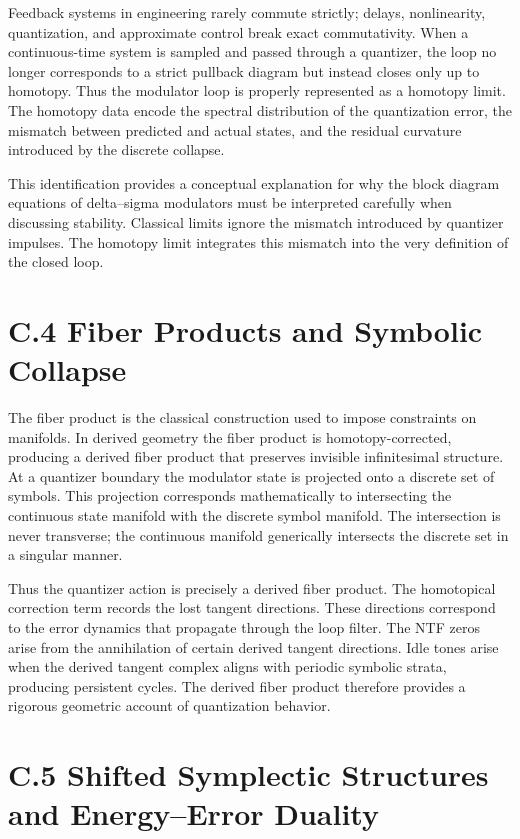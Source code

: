 Feedback systems in engineering rarely commute strictly; delays, nonlinearity, quantization, and approximate control break exact commutativity. When a continuous-time system is sampled and passed through a quantizer, the loop no longer corresponds to a strict pullback diagram but instead closes only up to homotopy. Thus the modulator loop is properly represented as a homotopy limit. The homotopy data encode the spectral distribution of the quantization error, the mismatch between predicted and actual states, and the residual curvature introduced by the discrete collapse.

This identification provides a conceptual explanation for why the block diagram equations of delta–sigma modulators must be interpreted carefully when discussing stability. Classical limits ignore the mismatch introduced by quantizer impulses. The homotopy limit integrates this mismatch into the very definition of the closed loop.

\section{C.4 Fiber Products and Symbolic Collapse}

The fiber product is the classical construction used to impose constraints on manifolds. In derived geometry the fiber product is homotopy-corrected, producing a derived fiber product that preserves invisible infinitesimal structure. At a quantizer boundary the modulator state is projected onto a discrete set of symbols. This projection corresponds mathematically to intersecting the continuous state manifold with the discrete symbol manifold. The intersection is never transverse; the continuous manifold generically intersects the discrete set in a singular manner.

Thus the quantizer action is precisely a derived fiber product. The homotopical correction term records the lost tangent directions. These directions correspond to the error dynamics that propagate through the loop filter. The NTF zeros arise from the annihilation of certain derived tangent directions. Idle tones arise when the derived tangent complex aligns with periodic symbolic strata, producing persistent cycles. The derived fiber product therefore provides a rigorous geometric account of quantization behavior.

\section{C.5 Shifted Symplectic Structures and Energy–Error Duality}

